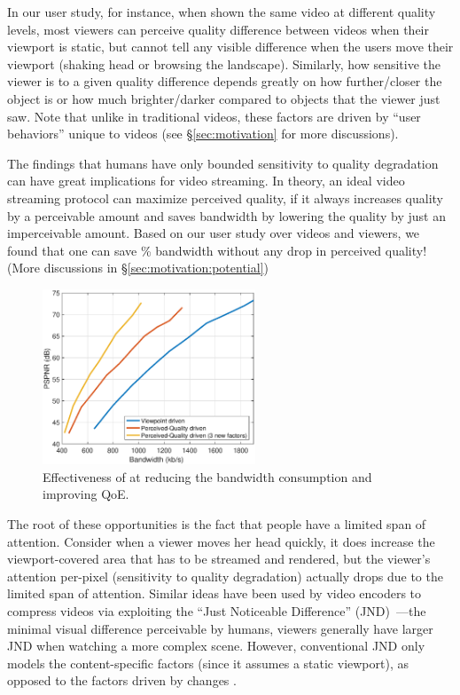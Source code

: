 In our user study, for instance, when shown the same video at different quality levels, most viewers can perceive quality difference between videos when their viewport is static, but cannot tell any visible difference when the users move their viewport (\eg shaking head or browsing the landscape).
Similarly, how sensitive the viewer is to a given quality difference depends greatly on how further/closer the object is or how much brighter/darker compared to objects that the viewer just saw.
Note that unlike in traditional videos, these factors are driven by ``user behaviors'' unique to \vr videos (see \S\ref{sec:motivation} for more discussions).




The findings that humans have only bounded sensitivity to quality degradation can have great implications for \vr video streaming. 
In theory, an ideal video streaming protocol can maximize perceived quality, if it always increases quality by a perceivable amount and saves bandwidth by lowering the quality by just an imperceivable amount. 
Based on our user study over \fillme videos and \fillme viewers, we found that one can save \fillme\% bandwidth without any drop in perceived quality! (More discussions in \S\ref{sec:motivation:potential})



\begin{figure}[t!]
  \centering
  \includegraphics[width=2.5in]{images/improvement.eps}
  \caption{Effectiveness of \name at reducing the bandwidth consumption and improving QoE. }
  \label{fig:intro-improvement}
  \end{figure}

The root of these opportunities is the fact that people have a limited span of attention.
Consider when a viewer moves her head quickly, it does increase the viewport-covered area that has to be streamed and rendered, but the viewer's attention per-pixel (\ie sensitivity to quality degradation) actually drops due to the limited span of attention.
Similar ideas have been used by video encoders to compress videos via exploiting the ``Just Noticeable Difference'' (JND)~\cite{??,??,??}---the minimal visual difference perceivable by humans, \eg viewers generally have larger JND when watching a more complex scene. 
However, conventional JND only models the content-specific factors (since it assumes a static viewport), as opposed to the factors driven by changes . 

